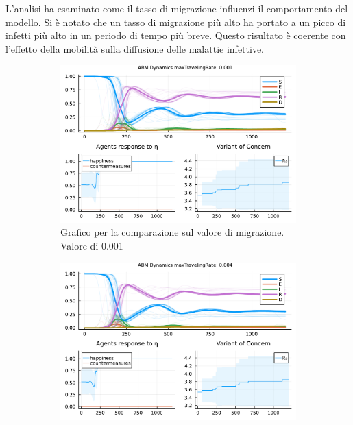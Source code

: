 L'analisi ha esaminato come il tasso di migrazione influenzi il 
comportamento del modello. Si è notato che un tasso di migrazione 
più alto ha portato a un picco di infetti più alto in un periodo 
di tempo più breve. Questo risultato è coerente con l'effetto 
della mobilità sulla diffusione delle malattie infettive.

\begin{figure}[!hb]
	\centering
	\begin{subfigure}[b]{0.45\textwidth}
		\centering
		\includegraphics[width=\textwidth]{img/SocialNetworkABM_1_MTR.pdf}
		\caption{Grafico per la comparazione sul valore di migrazione. Valore di 0.001}
		\label{fig:comparison_maxTravelingRate_low}
	\end{subfigure}
	\hfill
	\begin{subfigure}[b]{0.45\textwidth}
		\centering
		\includegraphics[width=\textwidth]{img/SocialNetworkABM_2_MTR.pdf}

\end{subfigure}
\end{figure}
